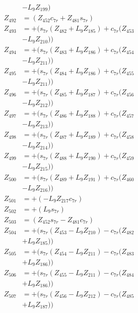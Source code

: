 \begin{multicols}{2}
\begin{align}
&- L_9Z_{199}) \nonumber \\
Z_{492} &= (Z_{452}c_{7r} + Z_{481}s_{7r}) \nonumber \\
Z_{493} &= + (s_{7r}(Z_{482} + L_9Z_{185}) + c_{7r}(Z_{453}  \nonumber \\
&- L_9Z_{210})) \nonumber \\
Z_{494} &= + (s_{7r}(Z_{483} + L_9Z_{186}) + c_{7r}(Z_{454}  \nonumber \\
&- L_9Z_{211})) \nonumber \\
Z_{495} &= + (s_{7r}(Z_{484} + L_9Z_{186}) + c_{7r}(Z_{455}  \nonumber \\
&- L_9Z_{211})) \nonumber \\
Z_{496} &= + (s_{7r}(Z_{485} + L_9Z_{187}) + c_{7r}(Z_{456}  \nonumber \\
&- L_9Z_{212})) \nonumber \\
Z_{497} &= + (s_{7r}(Z_{486} + L_9Z_{188}) + c_{7r}(Z_{457}  \nonumber \\
&- L_9Z_{213})) \nonumber \\
Z_{498} &= + (s_{7r}(Z_{487} + L_9Z_{189}) + c_{7r}(Z_{458}  \nonumber \\
&- L_9Z_{214})) \nonumber \\
Z_{499} &= + (s_{7r}(Z_{488} + L_9Z_{190}) + c_{7r}(Z_{459}  \nonumber \\
&- L_9Z_{215})) \nonumber \\
Z_{500} &= + (s_{7r}(Z_{489} + L_9Z_{191}) + c_{7r}(Z_{460}  \nonumber \\
&- L_9Z_{216})) \nonumber \\
Z_{501} &= + (-L_9Z_{217}c_{7r}) \nonumber \\
Z_{502} &= + (L_9s_{7r}) \nonumber \\
Z_{503} &= (Z_{452}s_{7r} - Z_{481}c_{7r}) \nonumber \\
Z_{504} &= + (s_{7r}(Z_{453} - L_9Z_{210}) - c_{7r}(Z_{482}  \nonumber \\
&+ L_9Z_{185})) \nonumber \\
Z_{505} &= + (s_{7r}(Z_{454} - L_9Z_{211}) - c_{7r}(Z_{483}  \nonumber \\
&+ L_9Z_{186})) \nonumber \\
Z_{506} &= + (s_{7r}(Z_{455} - L_9Z_{211}) - c_{7r}(Z_{484}  \nonumber \\
&+ L_9Z_{186})) \nonumber \\
Z_{507} &= + (s_{7r}(Z_{456} - L_9Z_{212}) - c_{7r}(Z_{485}  \nonumber \\
&+ L_9Z_{187})) \nonumber \\

\end{align}
\end{multicols}
